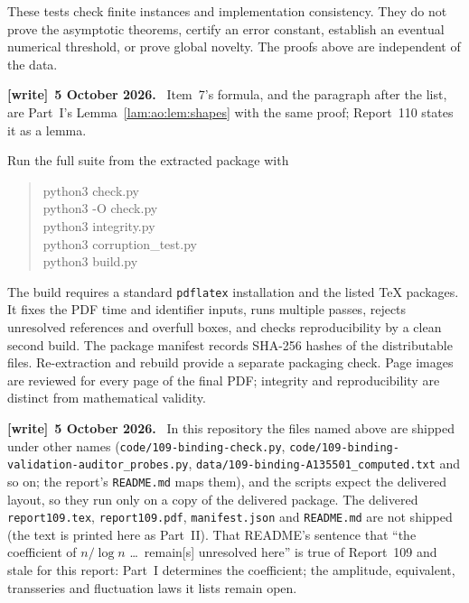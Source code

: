 \documentclass[11pt,a4paper]{article}
\numberwithin{equation}{section}
\theoremstyle{remark}
\newcommand{\file}[1]{\nolinkurl{#1}}
\newenvironment{writenote}[1][]{\par\smallskip\begingroup\small
 \noindent\textbf{[write]}\if\relax\detokenize{#1}\relax\else~\textbf{#1.}\fi\ }%
 {\par\endgroup\smallskip}
\begin{document}
These tests check finite instances and implementation consistency. They do not prove the asymptotic theorems, certify an error constant, establish an eventual numerical threshold, or prove global novelty. The proofs above are independent of the data.
\begin{writenote}[5 October 2026]
Item~7's formula, and the paragraph after the list, are Part~I's Lemma~\ref{lam:ao:lem:shapes} with the same proof; Report~110 states it as a lemma.
\end{writenote}

Run the full suite from the extracted package with
\begin{quote}\ttfamily
python3 check.py\\
python3 -O check.py\\
python3 integrity.py\\
python3 corruption\_test.py\\
python3 build.py
\end{quote}
The build requires a standard \texttt{pdflatex} installation and the listed \TeX{} packages. It fixes the PDF time and identifier inputs, runs multiple passes, rejects unresolved references and overfull boxes, and checks reproducibility by a clean second build. The package manifest records SHA-256 hashes of the distributable files. Re-extraction and rebuild provide a separate packaging check. Page images are reviewed for every page of the final PDF; integrity and reproducibility are distinct from mathematical validity.
\begin{writenote}[5 October 2026]
In this repository the files named above are shipped under other names (\file{code/109-binding-check.py}, \file{code/109-binding-validation-auditor_probes.py}, \file{data/109-binding-A135501_computed.txt} and so on; the report's \file{README.md} maps them), and the scripts expect the delivered layout, so they run only on a copy of the delivered package. The delivered \file{report109.tex}, \file{report109.pdf}, \file{manifest.json} and \file{README.md} are not shipped (the text is printed here as Part~II). That README's sentence that ``the coefficient of $n/\log n$ \ldots\ remain[s] unresolved here'' is true of Report~109 and stale for this report: Part~I determines the coefficient; the amplitude, equivalent, transseries and fluctuation laws it lists remain open.
\end{writenote}
\end{document}
